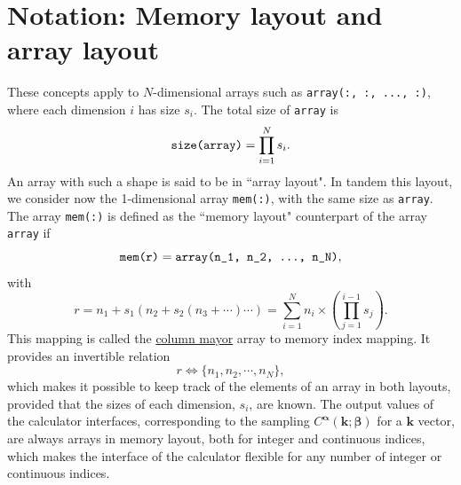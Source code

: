 \documentclass[10pt,a4paper]{article}
\begin{document}
\section{Notation: Memory layout and array layout}\label{sec:notation}
These concepts apply to $N$-dimensional arrays such as \verb|array(:, :, ..., :)|, where each dimension $i$ has size $s_i$. The total size of \verb|array| is
\begin{equation}
\verb|size(array)| = \prod_{i=1}^N s_i.
\end{equation}
An array with such a shape is said to be in ``array layout". In tandem this layout, we consider now the 1-dimensional array \verb|mem(:)|, with the same size as \verb|array|. The array \verb|mem(:)| is defined as the ``memory layout" counterpart of the array \verb|array| if
\begin{equation}
\verb|mem(r)| = \verb|array(n_1, n_2, ..., n_N)|,
\end{equation}
with
\begin{equation}\label{eq:column_mayor_mapping}
r = n_1 + s_1\left(n_2 + s_2\left(n_3 + \cdots\right)\cdots\right) = \sum_{i=1}^N n_i\times \left(\prod_{j=1}^{i-1}s_j\right).
\end{equation}
This mapping is called the \href{https://eli.thegreenplace.net/2015/memory-layout-of-multi-dimensional-arrays}{column mayor} array to memory index mapping. It provides an invertible relation
\begin{equation}
r \Leftrightarrow \{n_1, n_2, \cdots, n_N\},
\end{equation}
which makes it possible to keep track of the elements of an array in both layouts, provided that the sizes of each dimension, $s_i$, are known. The output values of the calculator interfaces, corresponding to the sampling $C^{\bm{\alpha}}(\bm{k}; \bm{\beta})$ for a $\bm{k}$ vector, are always arrays in memory layout, both for integer and continuous indices, which makes the interface of the calculator flexible for any number of integer or continuous indices.
\end{document}
